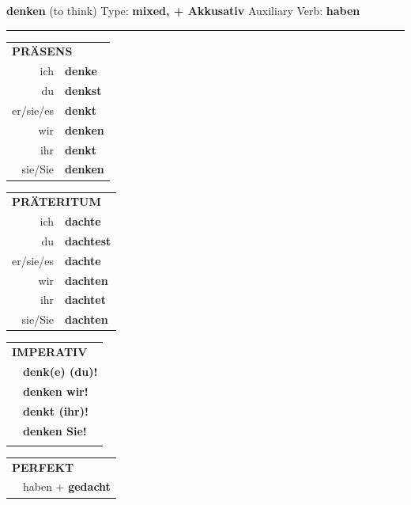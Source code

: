 \documentclass[10pt,a4paper]{revtex4-2}
\begin{document}
\begin{verbbox-acc}
    {\Large \bf denken} (to think) \hfill Type: \textbf{mixed, + Akkusativ} \hfill Auxiliary Verb: \textbf{haben} 
    
     \vspace{5pt}

    \hrule
    
    \vspace{5pt}

  \begin{tabular}{rl}
     \multicolumn{2}{l}{\textbf{PRÄSENS} }\\
    ich & \textbf{denke}\\
    du & \textbf{denkst}\\
    er/sie/es & \textbf{denkt}\\
    wir & \textbf{denken}\\
    ihr & \textbf{denkt}\\
    sie/Sie & \textbf{denken}\\
  \end{tabular}
  \hfill
     \begin{tabular}{rl}
    \multicolumn{2}{l}{\textbf{PRÄTERITUM} }\\
    ich & \textbf{dachte}\\
    du & \textbf{dachtest}\\
    er/sie/es & \textbf{dachte}\\
    wir & \textbf{dachten}\\
    ihr & \textbf{dachtet}\\
    sie/Sie & \textbf{dachten}\\
  \end{tabular}
  \hfill
  \begin{tabular}{rl}
     \multicolumn{2}{l}{\textbf{IMPERATIV} }\\
   & \textbf{denk(e) (du)!}\\
   & \textbf{denken wir!}\\
   & \textbf{denkt (ihr)!}\\
   & \textbf{denken Sie!}\\
   & \vspace{10pt}
  \end{tabular}

    \vspace{10pt}

 \begin{tabular}{rl}
     \multicolumn{2}{l}{\textbf{PERFEKT}}\\
  &  haben + \textbf{gedacht}\\
  \end{tabular}
\hfill
   \begin{tabular}{rl}
   

\end{tabular}
\end{verbbox-acc}
\end{document}
